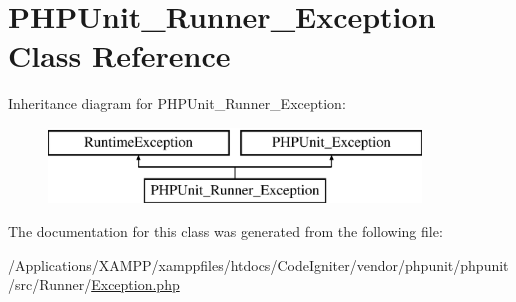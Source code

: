 \hypertarget{class_p_h_p_unit___runner___exception}{}\section{P\+H\+P\+Unit\+\_\+\+Runner\+\_\+\+Exception Class Reference}
\label{class_p_h_p_unit___runner___exception}
Inheritance diagram for P\+H\+P\+Unit\+\_\+\+Runner\+\_\+\+Exception\+:\begin{figure}[H]
\begin{center}
\leavevmode
\includegraphics[height=2.000000cm]{class_p_h_p_unit___runner___exception}
\end{center}
\end{figure}


The documentation for this class was generated from the following file\+:\begin{DoxyCompactItemize}
\item 
/\+Applications/\+X\+A\+M\+P\+P/xamppfiles/htdocs/\+Code\+Igniter/vendor/phpunit/phpunit/src/\+Runner/\mbox{\hyperlink{phpunit_2phpunit_2src_2_runner_2_exception_8php}{Exception.\+php}}\end{DoxyCompactItemize}
